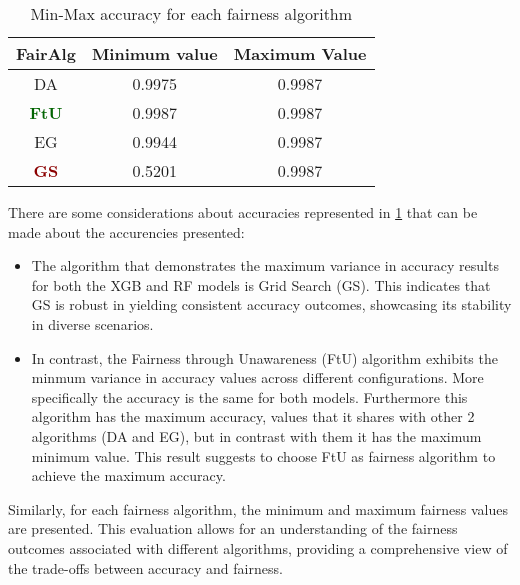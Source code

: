 \begin{table}
    \centering
    \begin{tabular}{|c|c|c|}
        \hline
        \textbf{FairAlg} & \textbf{Minimum value} & \textbf{Maximum Value} \\
        \hline
        DA & 0.9975 & 0.9987 \\
        \hline
        \textcolor{darkgreen}{\textbf{FtU}} & 0.9987 & 0.9987 \\
        \hline
        EG & 0.9944 & 0.9987 \\
        \hline
        \textcolor{darkred}{\textbf{GS}} & 0.5201 & 0.9987 \\
        \hline
    \end{tabular}
    \caption{Min-Max accuracy for each fairness algorithm}
    \label{tab:accuracies}
\end{table}

There are some considerations about accuracies represented in \cref{tab:accuracies} that can be made about the accurencies presented:
\begin{itemize}

    \item The algorithm that demonstrates the maximum variance in accuracy results for both the XGB and RF models is Grid Search (GS). This indicates that GS is robust in yielding consistent accuracy outcomes, showcasing its stability in diverse scenarios.

    \item In contrast, the Fairness through Unawareness (FtU) algorithm exhibits the minmum variance in accuracy values across different configurations. More specifically the accuracy is the same for both models. Furthermore this algorithm has the maximum accuracy, values that it shares with other 2 algorithms (DA and EG), but in contrast with them it has the maximum minimum value. This result suggests to choose FtU as fairness algorithm to achieve the maximum accuracy.
\end{itemize}

Similarly, for each fairness algorithm, the minimum and maximum fairness values are presented. This evaluation allows for an understanding of the fairness outcomes associated with different algorithms, providing a comprehensive view of the trade-offs between accuracy and fairness.

